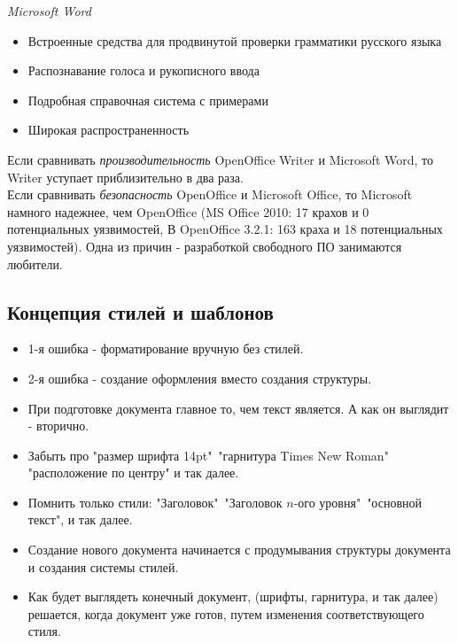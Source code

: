 \begin{center}
  \emph{Microsoft Word}
\end{center}
\begin{itemize}
  \item Встроенные средства для продвинутой проверки грамматики русского языка
  \item Распознавание голоса и рукописного ввода
  \item Подробная справочная система с примерами
  \item Широкая распространенность
\end{itemize}
Если сравнивать \emph{производительность} OpenOffice Writer и Microsoft Word, то Writer уступает приблизительно в два раза.
\\Если сравнивать \emph{безопасность} OpenOffice и Microsoft Office, то Microsoft намного надежнее, чем OpenOffice (MS Office 2010: 17 крахов и 0 потенциальных уязвимостей, В OpenOffice 3.2.1: 163 краха и 18 потенциальных уязвимостей). Одна из причин - разработкой свободного ПО занимаются любители.
\subsection{Концепция стилей и шаблонов}
\begin{itemize}
  \item 1-я ошибка - форматирование вручную без стилей.
  \item 2-я ошибка - создание оформления вместо создания структуры.
  \item При подготовке документа главное то, чем текст является. А как он выглядит - вторично.
  \item Забыть про "размер шрифта 14pt"\, "гарнитура Times New Roman"\, "расположение по центру" и так далее.
  \item Помнить только стили: "Заголовок"\, "Заголовок $n$-ого уровня"\, "основной текст", и так далее.
  \item Создание нового документа начинается с продумывания структуры документа и создания системы стилей.
  \item Как будет выглядеть конечный документ, (шрифты, гарнитура, и так далее) решается, когда документ уже готов, путем изменения соответствующего стиля.
\end{itemize}
